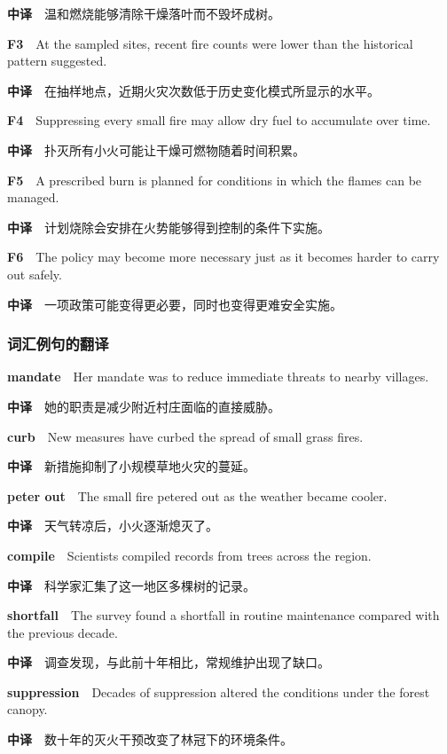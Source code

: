 \documentclass[
  11pt,
]{ctexart}
\begin{document}
\textbf{中译}　温和燃烧能够清除干燥落叶而不毁坏成树。

\textbf{F3}　At the sampled sites, recent fire counts were lower than
the historical pattern suggested.

\textbf{中译}　在抽样地点，近期火灾次数低于历史变化模式所显示的水平。

\textbf{F4}　Suppressing every small fire may allow dry fuel to
accumulate over time.

\textbf{中译}　扑灭所有小火可能让干燥可燃物随着时间积累。

\textbf{F5}　A prescribed burn is planned for conditions in which the
flames can be managed.

\textbf{中译}　计划烧除会安排在火势能够得到控制的条件下实施。

\textbf{F6}　The policy may become more necessary just as it becomes
harder to carry out safely.

\textbf{中译}　一项政策可能变得更必要，同时也变得更难安全实施。

\subsubsection{词汇例句的翻译}\label{ux8bcdux6c47ux4f8bux53e5ux7684ux7ffbux8bd1-1}

\textbf{mandate}　Her mandate was to reduce immediate threats to nearby
villages.

\textbf{中译}　她的职责是减少附近村庄面临的直接威胁。

\textbf{curb}　New measures have curbed the spread of small grass fires.

\textbf{中译}　新措施抑制了小规模草地火灾的蔓延。

\textbf{peter out}　The small fire petered out as the weather became
cooler.

\textbf{中译}　天气转凉后，小火逐渐熄灭了。

\textbf{compile}　Scientists compiled records from trees across the
region.

\textbf{中译}　科学家汇集了这一地区多棵树的记录。

\textbf{shortfall}　The survey found a shortfall in routine maintenance
compared with the previous decade.

\textbf{中译}　调查发现，与此前十年相比，常规维护出现了缺口。

\textbf{suppression}　Decades of suppression altered the conditions
under the forest canopy.

\textbf{中译}　数十年的灭火干预改变了林冠下的环境条件。
\end{document}
